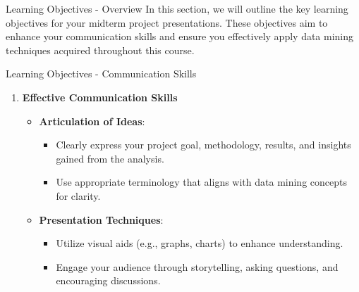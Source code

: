 \documentclass[aspectratio=169]{beamer}
\begin{document}
\begin{frame}[fragile]{Learning Objectives - Overview}
    In this section, we will outline the key learning objectives for your midterm project presentations. 
    These objectives aim to enhance your communication skills and ensure you effectively apply data mining techniques acquired throughout this course.
\end{frame}

\begin{frame}[fragile]{Learning Objectives - Communication Skills}
    \begin{enumerate}
        \item \textbf{Effective Communication Skills}
            \begin{itemize}
                \item \textbf{Articulation of Ideas}:
                    \begin{itemize}
                        \item Clearly express your project goal, methodology, results, and insights gained from the analysis.
                        \item Use appropriate terminology that aligns with data mining concepts for clarity.
                    \end{itemize}
                \item \textbf{Presentation Techniques}:
                    \begin{itemize}
                        \item Utilize visual aids (e.g., graphs, charts) to enhance understanding.
                        \item Engage your audience through storytelling, asking questions, and encouraging discussions.
                    \end{itemize}
            \end{itemize}
    \end{enumerate}
\end{frame}
\end{document}
